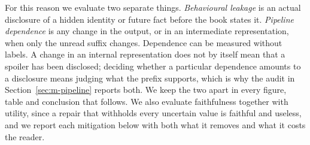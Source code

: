 \documentclass[sn-mathphys]{sn-jnl}%
\theoremstyle{thmstyleone}%
\theoremstyle{thmstyletwo}%
\theoremstyle{thmstylethree}%
\begin{document}
For this reason we evaluate two separate things. \emph{Behavioural leakage} is an actual disclosure of a hidden identity or future fact before the book states it. \emph{Pipeline dependence} is any change in the output, or in an intermediate representation, when only the unread suffix changes. Dependence can be measured without labels. A change in an internal representation does not by itself mean that a spoiler has been disclosed; deciding whether a particular dependence amounts to a disclosure means judging what the prefix supports, which is why the audit in Section~\ref{sec:m-pipeline} reports both. We keep the two apart in every figure, table and conclusion that follows. We also evaluate faithfulness together with utility, since a repair that withholds every uncertain value is faithful and useless, and we report each mitigation below with both what it removes and what it costs the reader.
\end{document}
